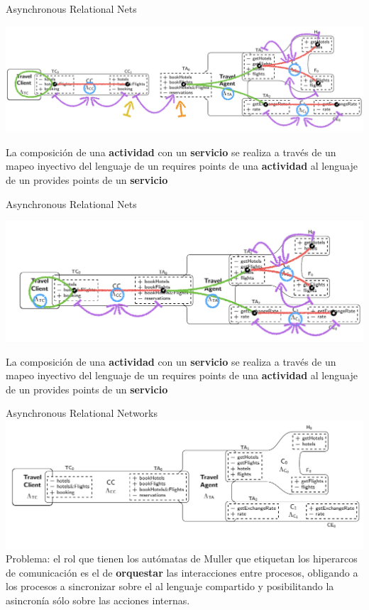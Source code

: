 \documentclass[10pt,xcolor={table,dvipsnames},t]{beamer}
\begin{document}
\begin{frame}{Asynchronous Relational Nets \cite{fiadeiro:fase2011}}
\begin{center}
\includegraphics[scale=0.39]{images/ARN7.png}
\end{center}
La composición de una \textbf{actividad} con un \textbf{servicio} se realiza a través de un \textcolor{map}{mapeo inyectivo} del lenguaje de un \textcolor{req}{requires points} de una \textbf{actividad} al lenguaje de un \textcolor{prov}{provides points} de un \textbf{servicio}
\end{frame}

\begin{frame}{Asynchronous Relational Nets \cite{fiadeiro:fase2011}}
\begin{center}
\includegraphics[scale=0.39]{images/ARN8.png}
\end{center}
La composición de una \textbf{actividad} con un \textbf{servicio} se realiza a través de un \textcolor{map}{mapeo inyectivo} del lenguaje de un \textcolor{req}{requires points} de una \textbf{actividad} al lenguaje de un \textcolor{prov}{provides points} de un \textbf{servicio}
\end{frame}


\begin{frame}{Asynchronous Relational Networks}
   \includegraphics[scale=0.45]{images/ARN9.png}
Problema: el rol que tienen los autómatas de Muller que etiquetan los hiperarcos de comunicación es el de \textbf{orquestar} las interacciones entre procesos, obligando a los procesos a sincronizar sobre el al lenguaje compartido y posibilitando la asincronía sólo sobre las acciones internas.
\end{frame}
\end{document}
